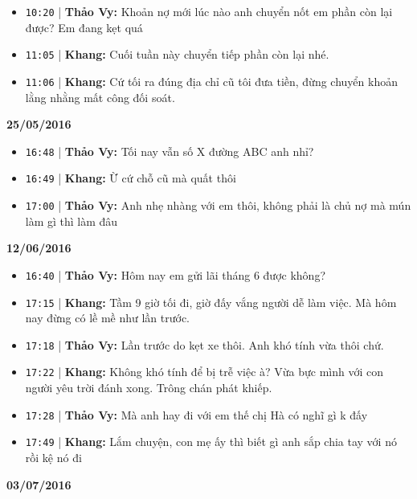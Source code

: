 \documentclass[12pt,a4paper]{article}
\begin{document}
\begin{itemize}[leftmargin=*, itemsep=2pt, topsep=2pt, parsep=0pt]
  \item \texttt{10:20} | \textbf{Thảo Vy:} Khoản nợ mới lúc nào anh chuyển nốt em phần còn lại được? Em đang kẹt quá
  \item \texttt{11:05} | \textbf{Khang:} Cuối tuần này chuyển tiếp phần còn lại nhé.
  \item \texttt{11:06} | \textbf{Khang:} Cứ tối ra đúng địa chỉ cũ tôi đưa tiền, đừng chuyển khoản lằng nhằng mất công đối soát.

\end{itemize}
\textbf{25/05/2016}

\begin{itemize}[leftmargin=*, itemsep=2pt, topsep=2pt, parsep=0pt]
  \item \texttt{16:48} | \textbf{Thảo Vy:} Tối nay vẫn số X đường ABC anh nhỉ?
  \item \texttt{16:49} | \textbf{Khang:} Ừ cứ chỗ cũ mà quất thôi
  \item \texttt{17:00} | \textbf{Thảo Vy:} Anh nhẹ nhàng với em thôi, không phải là chủ nợ mà mún làm gì thì làm đâu

\end{itemize}
\textbf{12/06/2016}

\begin{itemize}[leftmargin=*, itemsep=2pt, topsep=2pt, parsep=0pt]
  \item \texttt{16:40} | \textbf{Thảo Vy:} Hôm nay em gửi lãi tháng 6 được không?
  \item \texttt{17:15} | \textbf{Khang:} Tầm 9 giờ tối đi, giờ đấy vắng người dễ làm việc. Mà hôm nay đừng có lề mề như lần trước.
  \item \texttt{17:18} | \textbf{Thảo Vy:} Lần trước do kẹt xe thôi. Anh khó tính vừa thôi chứ.
  \item \texttt{17:22} | \textbf{Khang:} Không khó tính để bị trễ việc à? Vừa bực mình với con người yêu trời đánh xong. Trông chán phát khiếp.
  \item \texttt{17:28} | \textbf{Thảo Vy:} Mà anh hay đi với em thế chị Hà có nghĩ gì k đấy
  \item \texttt{17:49} | \textbf{Khang:} Lắm chuyện, con mẹ ấy thì biết gì anh sắp chia tay với nó rồi kệ nó đi

\end{itemize}
\textbf{03/07/2016}
\end{document}
